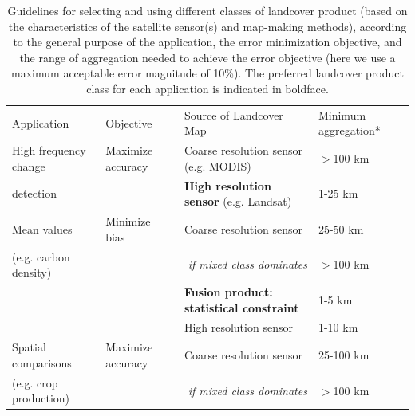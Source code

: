 \documentclass{pnastwo}
\begin{document}
\begin{article}

\begin{table}[!h]
  \begin{threeparttable}
    \caption{Guidelines for selecting and using different classes of landcover product (based on the characteristics of the satellite sensor(s) and map-making methods), according to the general purpose of the application, the error minimization objective, and the range of aggregation needed to achieve the error objective (here we use a maximum acceptable error magnitude of 10\%). The preferred landcover product class for each application is indicated in boldface. }
    \begin{center}
      \begin{tabular}{p{4.5cm}lp{6cm}l}
       \hline
Application                     & Objective & Source of Landcover Map & Minimum aggregation* \\
\Xhline{1pt}
High frequency change           & Maximize accuracy   & Coarse resolution sensor (e.g. MODIS) & $>$100 km\\
detection                                                               &                                  & \textbf{High resolution sensor} (e.g. Landsat)   &  1-25 km\\
\hline
Mean values         & Minimize bias            & Coarse resolution sensor  & 25-50 km \\
(e.g. carbon density)                                                              &                                   &  \multicolumn{1}{r}{\emph{if mixed class dominates}}                                    & $>$100 km \\
                                                              &                                   & \textbf{Fusion product: statistical constraint} & 1-5 km\\
                                                              &                                   & High resolution sensor & 1-10 km\\
\hline
Spatial comparisons & Maximize accuracy  & Coarse resolution sensor & 25-100 km\\
 (e.g. crop production)                                                               &                                   &  \multicolumn{1}{r}{\emph{if mixed class dominates}}                                    & $>$100 km \\

\end{tabular}
\end{center}
\end{threeparttable}
\end{table}
\end{article}
\end{document}
